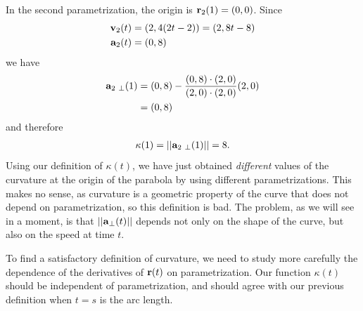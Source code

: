 \documentclass[12pt,letterpaper,reqno]{article}
\numberwithin{equation}{section}
\newcommand{\bv}{{\bf v}}
\newcommand{\ba}{{\bf a}}
\newcommand{\bbr}{{\bf r}}
\begin{document}
{\begin{example}
In the second parametrization, the origin is $\bbr_2(1)=(0,0)$. Since
\begin{align*}
	\bv_2(t)&=(2,4(2t-2))=(2,8t-8) \\
	\ba_2(t)&=(0,8) \\
\end{align*}
we have
\begin{align*}
	\ba_{2 \ \perp}(1)&=(0,8)-\frac{(0,8)\cdot (2,0)}{(2,0) \cdot (2,0)}(2,0) \\
	&=(0,8)
\end{align*}
and therefore
\begin{align*}
	\kappa(1)=||\ba_{2 \ \perp}(1)||=8.
\end{align*}
Using our definition of $\kappa(t)$, we have just obtained \emph{different} values of the curvature at the origin of the parabola by using different parametrizations. This makes no sense, as curvature is a geometric property of the curve that does not depend on parametrization, so this definition is bad. The problem, as we will see in a moment, is that $||\ba_\perp(t)||$ depends not only on the shape of the curve, but also on the speed at time $t$.
\end{example}

To find a satisfactory definition of curvature, we need to study more carefully the dependence of the derivatives of $\bbr(t)$ on parametrization. Our function $\kappa(t)$ should be independent of parametrization, and should agree with our previous definition when $t=s$ is the arc length.

}
\end{document}
